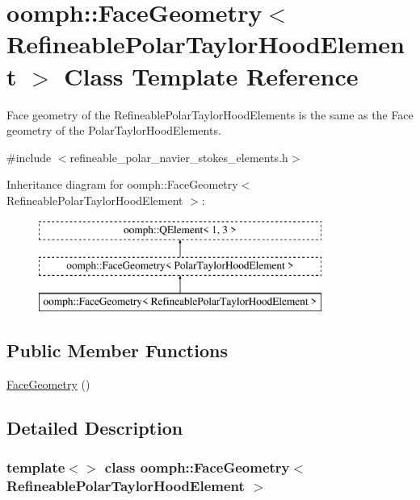 \hypertarget{classoomph_1_1FaceGeometry_3_01RefineablePolarTaylorHoodElement_01_4}{}\section{oomph\+:\+:Face\+Geometry$<$ Refineable\+Polar\+Taylor\+Hood\+Element $>$ Class Template Reference}
\label{classoomph_1_1FaceGeometry_3_01RefineablePolarTaylorHoodElement_01_4}


Face geometry of the Refineable\+Polar\+Taylor\+Hood\+Elements is the same as the Face geometry of the Polar\+Taylor\+Hood\+Elements.  




{\ttfamily \#include $<$refineable\+\_\+polar\+\_\+navier\+\_\+stokes\+\_\+elements.\+h$>$}

Inheritance diagram for oomph\+:\+:Face\+Geometry$<$ Refineable\+Polar\+Taylor\+Hood\+Element $>$\+:\begin{figure}[H]
\begin{center}
\leavevmode
\includegraphics[height=3.000000cm]{classoomph_1_1FaceGeometry_3_01RefineablePolarTaylorHoodElement_01_4}
\end{center}
\end{figure}
\subsection*{Public Member Functions}
\begin{DoxyCompactItemize}
\item 
\hyperlink{classoomph_1_1FaceGeometry_3_01RefineablePolarTaylorHoodElement_01_4_ae2d770c854faec2fd7b4a5725764d4db}{Face\+Geometry} ()
\end{DoxyCompactItemize}


\subsection{Detailed Description}
\subsubsection*{template$<$$>$\newline
class oomph\+::\+Face\+Geometry$<$ Refineable\+Polar\+Taylor\+Hood\+Element $>$}

